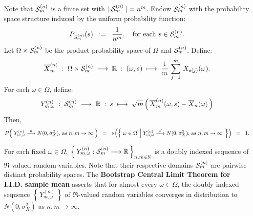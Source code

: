 \begin{theorem}
Note that $\mathcal{S}^{(n)}_{m}$ is a finite set with $\vert\;\mathcal{S}^{(n)}_{m}\;\vert = n^{m}$.
Endow $\mathcal{S}^{(n)}_{m}$ with the probability space structure induced by the uniform probability function:
\begin{equation*}
P_{\mathcal{S}^{(n)}_{m}}(s) \;\; := \;\; \dfrac{1}{n^{m}},
\quad\textnormal{for each $s \in \mathcal{S}^{(n)}_{m}$}.
\end{equation*}
Let $\Omega \times \mathcal{S}^{(n)}_{m}$ be the product probability space of $\Omega$ and $\mathcal{S}^{(n)}_{m}$.
Define:
\begin{equation*}
\overline{X}^{(n)}_{m}
\;:\;\Omega \times \mathcal{S}^{(n)}_{m} \;\longrightarrow \; \mathbb{R}
\;:\; (\omega,s) \; \longmapsto \; \dfrac{1}{m}\,\sum^{m}_{j=1}\,X_{s(j)}(\omega).
\end{equation*}
For each $\omega \in \Omega$, define:
\begin{equation*}
Y^{(n)}_{m,\omega}
\;:\;
\mathcal{S}^{(n)}_{m}\;\longrightarrow\; \mathbb{R}
\;:\;
s
\;\longmapsto\;
\sqrt{m}\left(\,\overline{X}^{(n)}_{m}(\omega,s) - \overline{X}_{n}(\omega)\,\right)
\end{equation*}
Then,
\begin{equation*}
P\!\left(\;
Y^{(n)}_{m,\omega} \overset{d}{\longrightarrow} N(0,\sigma^{2}_{X}),\,\textnormal{as $n,m\rightarrow\infty$}
\;\right)
\;\; = \;\;
\nu\!\left(\left\{\;
\omega \in \Omega
\;\left\vert\;
Y^{(n)}_{m,\omega} \overset{d}{\longrightarrow} N(0,\sigma^{2}_{X}),\,\textnormal{as $n,m\rightarrow\infty$}
\right.
\;\right\}\right)
\;\; = \;\;
1.
\end{equation*}
\end{theorem}

\begin{remark}
\mbox{}\vskip 0.1cm
\noindent
For each fixed $\omega \in \Omega$,
$\left\{\,Y^{(n)}_{m,\omega} : \mathcal{S}^{(n)}_{m} \longrightarrow \mathbb{R}\,\right\}_{n,m\in\mathbb{N}}$
is a doubly indexed sequence of $\Re$-valued random variables.
Note that their respective domains $\mathcal{S}^{(n)}_{m}$ are pairwise distinct probability spaces.
The \textbf{Bootstrap Central Limit Theorem for I.I.D. sample mean}
asserts that for almost every $\omega \in \Omega$,
the doubly indexed sequence $\left\{\,Y^{(n)}_{m,\omega}\,\right\}$
of $\Re$-valued random variables converges in distribution to
$N(0,\sigma^{2}_{X})$ as $n, m \longrightarrow \infty$.
\end{remark}

